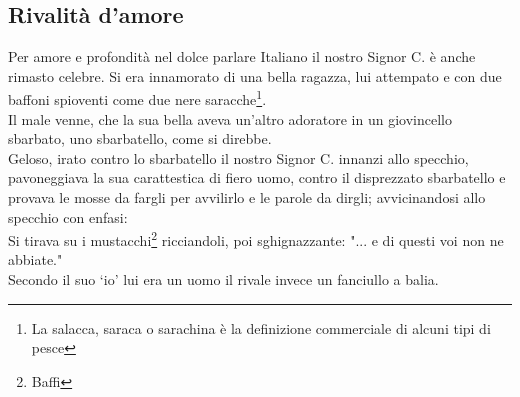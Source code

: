 \subsection{Rivalità d'amore}
Per amore e profondità nel dolce parlare Italiano il nostro Signor C. è anche rimasto celebre. Si era innamorato di una bella ragazza, lui attempato e con due baffoni spioventi come due nere saracche\footnote{La salacca, saraca o sarachina è la definizione commerciale di alcuni tipi di pesce}. \\
Il male venne, che la sua bella aveva un'altro adoratore in un giovincello sbarbato, uno sbarbatello, come si direbbe.\\
Geloso, irato contro lo sbarbatello il nostro Signor C. innanzi allo specchio, pavoneggiava la sua carattestica di fiero uomo, contro il disprezzato sbarbatello e provava le mosse da fargli per avvilirlo e le parole da dirgli; avvicinandosi allo specchio con enfasi:\\
Si tirava su i mustacchi\footnote{Baffi} ricciandoli, poi sghignazzante: "... e di questi voi non ne abbiate."\\
Secondo il suo ‘io' lui era un uomo il rivale invece un fanciullo a balia.


